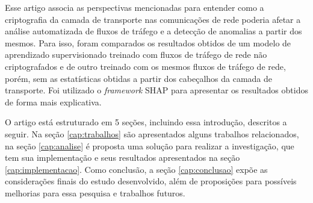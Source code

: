 \documentclass[12pt]{article}
\begin{document}

Esse artigo associa as perspectivas mencionadas para entender como a criptografia da camada de transporte nas comunicações de rede poderia afetar a análise automatizada de fluxos de tráfego e a detecção de anomalias a partir dos mesmos. Para isso, foram comparados os resultados obtidos de um modelo de aprendizado supervisionado treinado com fluxos de tráfego de rede não criptografados e de outro treinado com os mesmos fluxos de tráfego de rede, porém, sem as estatísticas obtidas a partir dos cabeçalhos da camada de transporte. Foi utilizado o \emph{framework} SHAP \cite{lundberg2017unified} para apresentar os resultados obtidos de forma mais explicativa.

O artigo está estruturado em 5 seções, incluindo essa introdução, descritos a seguir. Na seção \ref{cap:trabalhos} são apresentados alguns trabalhos relacionados, na seção \ref{cap:analise} é proposta uma solução para realizar a investigação, que tem sua implementação e seus resultados apresentados na seção \ref{cap:implementacao}. Como conclusão, a seção \ref{cap:conclusao} expõe as considerações finais do estudo desenvolvido, além de proposições para possíveis melhorias para essa pesquisa e trabalhos futuros.


\end{document}
